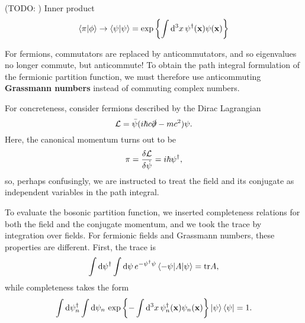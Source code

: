 
(TODO: )
Inner product
\begin{equation}
	\braket{\pi | \phi} \rightarrow \braket{\psi | \psi} = \exp \left\{ \int \mathop{}\!\mathrm{d}^3 x \, \psi^\dagger(\mathbf{x}) \psi(\mathbf{x}) \right\}
\end{equation}

For fermions, commutators are replaced by anticommutators, and so eigenvalues no longer commute, but anticommute!
To obtain the path integral formulation of the fermionic partition function, we must therefore use anticommuting \textbf{Grassmann numbers} instead of commuting complex numbers.

For concreteness, consider fermions described by the Dirac Lagrangian
\begin{equation}
	\mathcal{L} = \bar{\psi} (i \hbar c \slashed\partial - m c^2) \psi .
\end{equation}
Here, the canonical momentum turns out to be
\begin{equation}
	\pi = \fdv{\lagr}{\dot\psi} = i \hbar \psi^\dagger ,
\end{equation}
so, perhaps confusingly, we are instructed to treat the field and its conjugate as independent variables in the path integral.

To evaluate the bosonic partition function, we inserted completeness relations for both the field and the conjugate momentum, and we took the trace by integration over fields.
For fermionic fields and Grassmann numbers, these properties are different.
First, the trace is
\begin{equation}
	\int \mathop{}\!\mathrm{d} \psi^\dagger \int \mathop{}\!\mathrm{d} \psi \, e^{-\psi^\dagger \psi} \braket{-\psi | A | \psi} = \text{tr} A ,
\label{eq:tft:trace_grassmann}
\end{equation}
while completeness takes the form
\begin{equation}
	\int \mathop{}\!\mathrm{d} \psi_n^\dagger \int \mathop{}\!\mathrm{d} \psi_n \, \exp \left\{-\int \mathop{}\!\mathrm{d}^3 x \, \psi_{n}^\dagger(\mathbf{x}) \psi_{n}(\mathbf{x}) \right\} \ket{\psi} \bra{\psi} = 1 .
\label{eq:tft:completeness_grassmann}
\end{equation}

